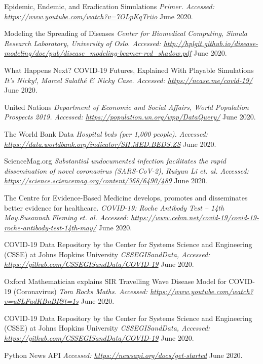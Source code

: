 \begin{thebibliography}{1}
 Epidemic, Endemic, and Eradication Simulations {\em Primer. Accessed:  \url{https://www.youtube.com/watch?v=7OLpKqTriio}} June 2020.

 Modeling the Spreading of Diseases {\em Center for Biomedical Computing, Simula Research Laboratory, University of Oslo. Accessed:  \url{http://hplgit.github.io/disease-modeling/doc/pub/disease_modeling-beamer-red_shadow.pdf}} June 2020.

 What Happens Next? COVID-19 Futures, Explained With Playable Simulations {\em It's Nicky!, Marcel Salathé & Nicky Case. Accessed:  \url{https://ncase.me/covid-19/}} June 2020.

 United Nations {\em Department of Economic and Social Affairs, World Population Prospects 2019. Accessed:  \url{https://population.un.org/wpp/DataQuery/}} June 2020.

 The World Bank Data {\em Hospital beds (per 1,000 people). Accessed:  \url{https://data.worldbank.org/indicator/SH.MED.BEDS.ZS}} June 2020.

 ScienceMag.org {\em Substantial undocumented infection facilitates the rapid dissemination of novel coronavirus (SARS-CoV-2), Ruiyun Li et. al. Accessed:  \url{https://science.sciencemag.org/content/368/6490/489}} June 2020.

 The Centre for Evidence-Based Medicine develops, promotes and disseminates better evidence for healthcare. {\em COVID-19: Roche Antibody Test – 14th May.Susannah Fleming et. al. Accessed:  \url{https://www.cebm.net/covid-19/covid-19-roche-antibody-test-14th-may/}} June 2020.

 COVID-19 Data Repository by the Center for Systems Science and Engineering (CSSE) at Johns Hopkins University {\em CSSEGISandData, Accessed:  \url{https://github.com/CSSEGISandData/COVID-19}} June 2020.

 Oxford Mathematician explains SIR Travelling Wave Disease Model for COVID-19 (Coronavirus) {\em Tom Rocks Maths. Accessed:  \url{https://www.youtube.com/watch?v=uSLFudKBnBI&t=1s}} June 2020.

 COVID-19 Data Repository by the Center for Systems Science and Engineering (CSSE) at Johns Hopkins University {\em CSSEGISandData, Accessed:  \url{https://github.com/CSSEGISandData/COVID-19}} June 2020.

 Python News API {\em Accessed:  \url{https://newsapi.org/docs/get-started}} June 2020.


\end{thebibliography}
